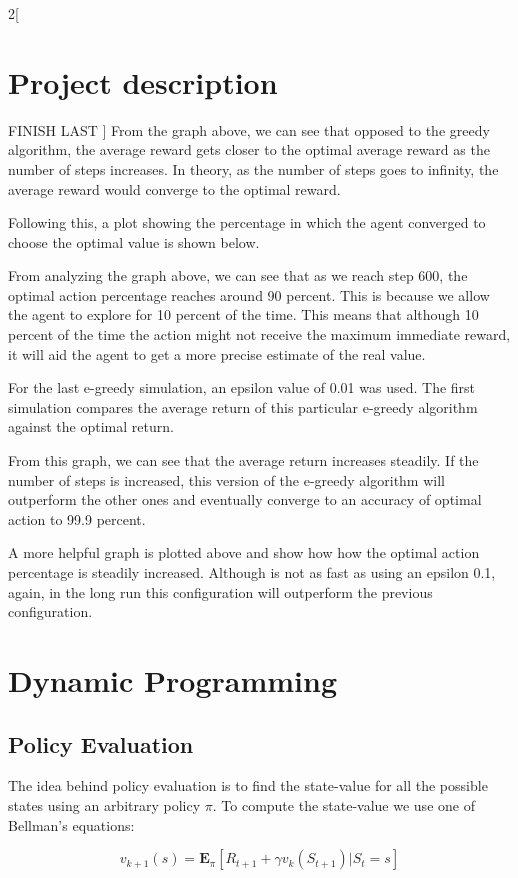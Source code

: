\documentclass[a4paper]{article}
\begin{document}
\begin{multicols}{2}[
		\section*{Project description}
		FINISH LAST
		]
		From the graph above, we can see that opposed to the greedy algorithm, the average reward gets closer to the optimal average reward as the number of steps increases. In theory, as the number of steps goes to infinity, the average reward would converge to the optimal reward. 
		
		Following this, a plot showing the percentage in which the agent converged to choose the optimal value is shown below.
		

		
		From analyzing the graph above, we can see that as we reach step 600, the optimal action percentage reaches around 90 percent. This is because we allow the agent to explore for 10 percent of the time. This means that although 10 percent of the time the action might not receive the maximum immediate reward, it will aid the agent to get a more precise estimate of the real value. 
		
		For the last e-greedy simulation, an epsilon value of 0.01 was used. The first simulation compares the average return of this particular e-greedy algorithm against the optimal return.
		
		
		From this graph, we can see that the average return increases steadily. If the number of steps is increased, this version of the e-greedy algorithm will outperform the other ones and eventually converge to an accuracy of optimal action to 99.9 percent.
		
	
		A more helpful graph is plotted above and show how how the optimal action percentage is steadily increased. Although is not as fast as using an epsilon 0.1, again, in the long run this configuration will outperform the previous configuration.
		
		\section{Dynamic Programming}
		\subsection{Policy Evaluation}
		The idea behind policy evaluation is to find the state-value for all the possible states using an arbitrary policy $\pi$. To compute the state-value we use one of Bellman's equations:
		
		\begin{equation}
			v_{k+1}(s) = \mathbf{E}_\pi[R_{t+1} + \gamma v_k(S_{t+1}) | S_t = s]
		\end{equation}
		

\end{multicols}
\end{document}
